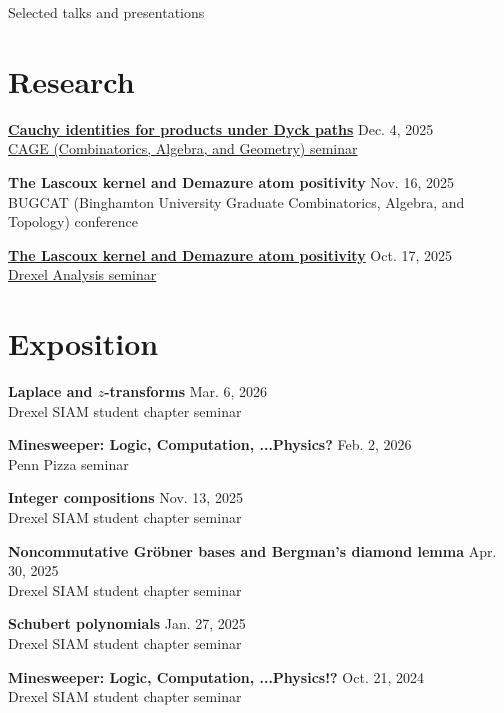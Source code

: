 \documentclass[
	11pt, %
]{resume} %
\begin{document}
\begin{rSection}{Selected talks and presentations}

    \section*{Research}

    \textbf{\href{https://darijgrinberg.gitlab.io/cage/abstracts/2025-fall-ty.html}{Cauchy identities for products under Dyck paths}}
    \hfill Dec. 4, 2025 \\
    \href{https://darijgrinberg.gitlab.io/cage/index.html}{CAGE (Combinatorics, Algebra, and Geometry) seminar}

    \textbf{The Lascoux kernel and Demazure atom positivity}
    \hfill Nov. 16, 2025 \\
    BUGCAT (Binghamton University Graduate Combinatorics, Algebra, and Topology) conference

    \textbf{\href{https://www.math.drexel.edu/~tolya/ty\%2010.17.2025.pdf}{The Lascoux kernel and Demazure atom positivity}}
    \hfill Oct. 17, 2025 \\
    \href{https://www.math.drexel.edu/~tolya/analysis.html}{Drexel Analysis seminar}

    \section*{Exposition}

    \textbf{Laplace and $z$-transforms}
    \hfill Mar. 6, 2026 \\
    Drexel SIAM student chapter seminar

    \textbf{Minesweeper: Logic, Computation, ...Physics?} 
    \hfill Feb. 2, 2026 \\
    Penn Pizza seminar


    \textbf{Integer compositions}
    \hfill Nov. 13, 2025 \\
    Drexel SIAM student chapter seminar

    \textbf{Noncommutative Gröbner bases and Bergman's diamond lemma}
    \hfill Apr. 30, 2025 \\
    Drexel SIAM student chapter seminar

    \textbf{Schubert polynomials} 
    \hfill Jan. 27, 2025 \\
    Drexel SIAM student chapter seminar

    \textbf{Minesweeper: Logic, Computation, ...Physics!?} 
    \hfill Oct. 21, 2024 \\
    Drexel SIAM student chapter seminar


\end{rSection}
\end{document}
